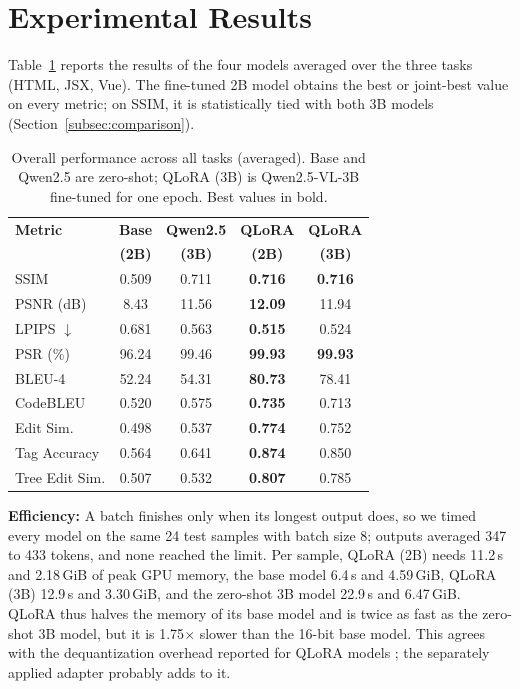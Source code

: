\documentclass[conference,a4paper]{IEEEtran}
\begin{document}
\section{Experimental Results}
\label{sec:results}

Table~\ref{tab:results} reports the results of the four models averaged over the three tasks (HTML, JSX, Vue). The fine-tuned 2B model obtains the best or joint-best value on every metric; on SSIM, it is statistically tied with both 3B models (Section~\ref{subsec:comparison}).

\begin{table}[htbp]
\centering
\caption{Overall performance across all tasks (averaged). Base and Qwen2.5 are zero-shot; QLoRA (3B) is Qwen2.5-VL-3B fine-tuned for one epoch. Best values in bold.}
\label{tab:results}
\footnotesize
\setlength{\tabcolsep}{3pt}
\renewcommand{\arraystretch}{1.1}
\begin{tabular}{lcccc}
\hline
\textbf{Metric} & \textbf{Base} & \textbf{Qwen2.5} & \textbf{QLoRA} & \textbf{QLoRA} \\
 & \textbf{(2B)} & \textbf{(3B)} & \textbf{(2B)} & \textbf{(3B)} \\
\hline
SSIM & 0.509 & 0.711 & \textbf{0.716} & \textbf{0.716} \\
PSNR (dB) & 8.43 & 11.56 & \textbf{12.09} & 11.94 \\
LPIPS $\downarrow$ & 0.681 & 0.563 & \textbf{0.515} & 0.524 \\
\hline
PSR (\%) & 96.24 & 99.46 & \textbf{99.93} & \textbf{99.93} \\
BLEU-4 & 52.24 & 54.31 & \textbf{80.73} & 78.41 \\
CodeBLEU & 0.520 & 0.575 & \textbf{0.735} & 0.713 \\
Edit Sim. & 0.498 & 0.537 & \textbf{0.774} & 0.752 \\
Tag Accuracy & 0.564 & 0.641 & \textbf{0.874} & 0.850 \\
Tree Edit Sim. & 0.507 & 0.532 & \textbf{0.807} & 0.785 \\
\hline
\end{tabular}
\end{table}

\textbf{Efficiency:} A batch finishes only when its longest output does, so we timed every model on the same 24 test samples with batch size 8; outputs averaged 347 to 433 tokens, and none reached the limit. Per sample, QLoRA (2B) needs 11.2\,s and 2.18\,GiB of peak GPU memory, the base model 6.4\,s and 4.59\,GiB, QLoRA (3B) 12.9\,s and 3.30\,GiB, and the zero-shot 3B model 22.9\,s and 6.47\,GiB. QLoRA thus halves the memory of its base model and is twice as fast as the zero-shot 3B model, but it is 1.75$\times$ slower than the 16-bit base model. This agrees with the dequantization overhead reported for QLoRA models \cite{huang2024llama3quant}; the separately applied adapter probably adds to it.
\end{document}
